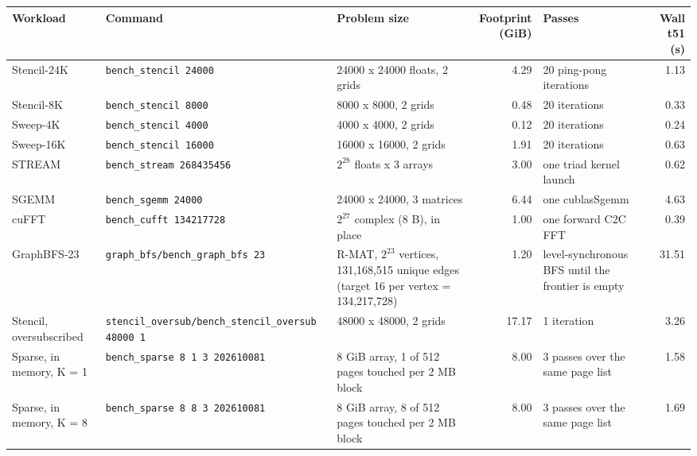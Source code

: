 \begin{tabular}{@{}lp{1.35in}p{1.65in}rp{0.95in}r@{}}
\toprule
Workload & Command & Problem size & \makecell[r]{Footprint\\(GiB)} & Passes & \makecell[r]{Wall t51\\(s)} \\
\midrule
Stencil-24K & \texttt{bench\_\allowbreak{}stencil 24000} & 24000 x 24000 floats, 2 grids & 4.29 & 20 ping-pong iterations & 1.13 \\ %
Stencil-8K & \texttt{bench\_\allowbreak{}stencil 8000} & 8000 x 8000, 2 grids & 0.48 & 20 iterations & 0.33 \\ %
Sweep-4K & \texttt{bench\_\allowbreak{}stencil 4000} & 4000 x 4000, 2 grids & 0.12 & 20 iterations & 0.24 \\ %
Sweep-16K & \texttt{bench\_\allowbreak{}stencil 16000} & 16000 x 16000, 2 grids & 1.91 & 20 iterations & 0.63 \\ %
STREAM & \texttt{bench\_\allowbreak{}stream 268435456} & $2^{28}$ floats x 3 arrays & 3.00 & one triad kernel launch & 0.62 \\ %
SGEMM & \texttt{bench\_\allowbreak{}sgemm 24000} & 24000 x 24000, 3 matrices & 6.44 & one cublasSgemm & 4.63 \\ %
cuFFT & \texttt{bench\_\allowbreak{}cufft 134217728} & $2^{27}$ complex (8 B), in place & 1.00 & one forward C2C FFT & 0.39 \\ %
GraphBFS-23 & \texttt{graph\_\allowbreak{}bfs/\allowbreak{}bench\_\allowbreak{}graph\_\allowbreak{}bfs 23} & R-MAT, $2^{23}$ vertices, 131,168,515 unique edges (target 16 per vertex = 134,217,728) & 1.20 & level-synchronous BFS until the frontier is empty & 31.51 \\ %
Stencil, oversubscribed & \texttt{stencil\_\allowbreak{}oversub/\allowbreak{}bench\_\allowbreak{}stencil\_\allowbreak{}oversub 48000 1} & 48000 x 48000, 2 grids & 17.17 & 1 iteration & 3.26 \\ %
Sparse, in memory, K = 1 & \texttt{bench\_\allowbreak{}sparse 8 1 3 202610081} & 8 GiB array, 1 of 512 pages touched per 2 MB block & 8.00 & 3 passes over the same page list & 1.58 \\ %
Sparse, in memory, K = 8 & \texttt{bench\_\allowbreak{}sparse 8 8 3 202610081} & 8 GiB array, 8 of 512 pages touched per 2 MB block & 8.00 & 3 passes over the same page list & 1.69 \\ %

\end{tabular}
